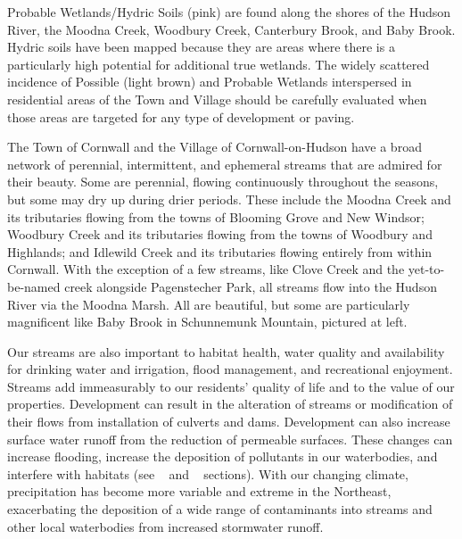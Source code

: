 Probable Wetlands/Hydric Soils (pink) are found along the shores of the Hudson 
River, the Moodna Creek, Woodbury Creek, Canterbury Brook, and Baby Brook. 
Hydric soils have been mapped because they are areas where there is a 
particularly high potential for additional true wetlands. The widely scattered 
incidence of Possible (light brown) and Probable Wetlands interspersed in 
residential areas of the Town and Village should be carefully evaluated when 
those areas are targeted for any type of development or paving.
\label{map:wetlandsandhydricsoils}


The Town of Cornwall and the Village of Cornwall-on-Hudson have a broad network 
of perennial, intermittent, and ephemeral streams that are admired for their 
beauty. Some are perennial, flowing continuously throughout the seasons, but 
some may dry up during drier periods. These include the Moodna Creek and its 
tributaries flowing from the towns of Blooming Grove and New Windsor; Woodbury 
Creek and its tributaries flowing from the towns of Woodbury and Highlands; and 
Idlewild Creek and its tributaries flowing entirely from within Cornwall. With 
the exception of a few streams, like Clove Creek and the yet-to-be-named creek 
alongside Pagenstecher Park, all streams flow into the Hudson River via the 
Moodna Marsh. All are beautiful, but some are particularly magnificent like Baby 
Brook in Schunnemunk Mountain, pictured at left.

Our streams are also important to habitat health, water quality and 
availability for drinking water and irrigation, flood management, and 
recreational enjoyment. Streams add immeasurably to our residents’ quality of 
life and to the value of our properties. Development can result in the 
alteration of streams or modification of their flows from installation of 
culverts and dams. Development can also increase surface water runoff from the 
reduction of permeable surfaces. These changes can increase flooding, increase 
the deposition of pollutants in our waterbodies, and interfere with habitats 
(see ~ and 
~ sections). With our changing climate, 
precipitation has become more variable and extreme in the Northeast, 
exacerbating the deposition of a wide range of contaminants into streams and 
other local waterbodies from increased stormwater runoff.

